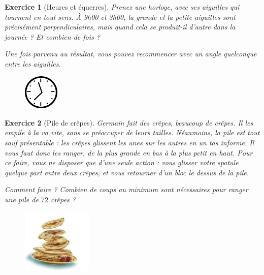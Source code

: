 \documentclass[12pt]{article}
\theoremstyle{break}
\newtheorem{exo}{Exercice}
\begin{document}
\begin{exo}[Heures et équerres]
Prenez une horloge, avec ses aiguilles qui tournent en tout sens. À 9h00 et 3h00, la grande et la petite aiguilles sont précisément perpendiculaires, mais quand cela se produit-il d'autre dans la journée ? Et combien de fois ?

Une fois parvenu au résultat, vous pouvez recommencer avec un angle quelconque entre les aiguilles.

\begin{figure}[h!]
	\centering
    \includegraphics[width=0.15\textwidth]{horloge.png}
\end{figure}
\end{exo}


\begin{exo}[Pile de crêpes]
Germain fait des crêpes, beaucoup de crêpes. Il les empile à la va vite, sans se préoccuper de leurs tailles. Néanmoins, la pile est tout sauf présentable : les crêpes glissent les unes sur les autres en un tas informe. Il vous faut donc les ranger, de la plus grande en bas à la plus petit en haut. Pour ce faire, vous ne disposer que d'une seule action : vous glisser votre spatule quelque part entre deux crêpes, et vous retourner d'un bloc le dessus de la pile.

Comment faire ? Combien de coups au minimum sont nécessaires pour ranger une pile de $72$ crêpes ?

\begin{figure}[h!]
	\centering
    \includegraphics[width=0.3\textwidth]{PileDeCrepes.jpg}
\end{figure}
\end{exo}
\end{document}
